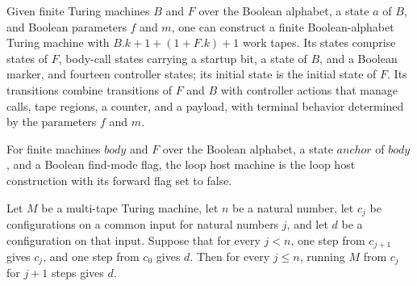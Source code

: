 \begin{definition}
\label{Turing.FinTM.loopHostM}
\leanok
{}
Given finite Turing machines $B$ and $F$ over the Boolean alphabet, a state $a$ of $B$,
and Boolean parameters $f$ and $m$, one can construct a finite Boolean-alphabet Turing
machine with $B.k+1+(1+F.k)+1$ work tapes. Its states comprise states of $F$, body-call
states carrying a startup bit, a state of $B$, and a Boolean marker, and fourteen
controller states; its initial state is the initial state of $F$. Its transitions
combine transitions of $F$ and $B$ with controller actions that manage calls, tape
regions, a counter, and a payload, with terminal behavior determined by the parameters
$f$ and $m$.
\end{definition}

\begin{definition}
\label{Turing.FinTM.loopHostTM}
\leanok
{}
For finite machines $body$ and $F$ over the Boolean alphabet, a state $anchor$ of
$body$, and a Boolean find-mode flag, the loop host machine is the loop host
construction with its forward flag set to false.
\end{definition}

\begin{lemma}
\label{Turing.FinTM.loop_scan_left}
\leanok
{}
Let $M$ be a multi-tape Turing machine, let $n$ be a natural number, let $c_j$ be
configurations on a common input for natural numbers $j$, and let $d$ be a configuration
on that input. Suppose that for every $j<n$, one step from $c_{j+1}$ gives $c_j$, and
one step from $c_0$ gives $d$. Then for every $j\le n$, running $M$ from $c_j$ for $j+1$
steps gives $d$.
\end{lemma}

